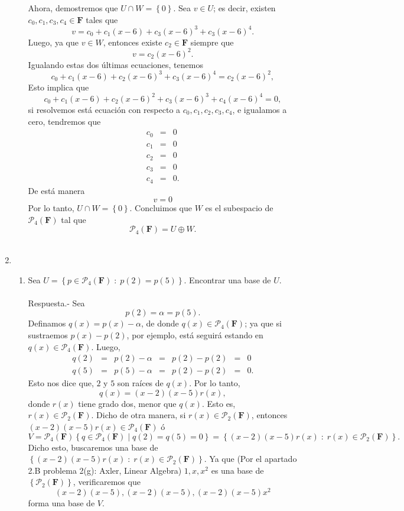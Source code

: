 \begin{enumerate}[\bfseries 1.]
\begin{enumerate}[(a)]
		Ahora, demostremos que $U\cap W=\left\{0\right\}.$ Sea $v\in U$; es decir, existen $c_0,c_1,c_3,c_4\in \textbf{F}$ tales que
		$$v=c_0+c_1(x-6)+c_3(x-6)^3+c_3(x-6)^4.$$
		Luego, ya que $v\in W$, entonces existe $c_2\in \textbf{F}$ siempre que
		$$v=c_2(x-6)^2.$$
		Igualando estas dos últimas ecuaciones, tenemos
		$$c_0+c_1(x-6)+c_2(x-6)^3+c_3(x-6)^4=c_2(x-6)^2,$$
		Esto implica que
		$$c_0+c_1(x-6)+c_2(x-6)^2+c_3(x-6)^3+c_4(x-6)^4=0,$$
		si resolvemos está ecuación con respecto a $c_0,c_1,c_2,c_3,c_4$, e igualamos a cero, tendremos que
		$$
		\begin{array}{rcl}
		    c_0&=&0\\
		    c_1&=&0\\
		    c_2&=&0\\
		    c_3&=&0\\
		    c_4&=&0.
		\end{array}
		$$
		De está manera 
		$$v=0$$
		Por lo tanto, $U\cap W=\left\{0\right\}$. Concluimos que $W$ es el subespacio de $\mathcal{P}_4(\textbf{F})$ tal que 
		$$\mathcal{P}_4(\textbf{F})=U\oplus W.$$\\

	\end{enumerate}

    \item 
	\begin{enumerate}[\bfseries (a)]

	    \item Sea $U=\left\{p\in \mathcal{P}_4(\textbf{F})\; : \; p(2)=p(5)\right\}$. Encontrar una base de $U$.\\\\
		Respuesta.-\; Sea 
		$$p(2)=\alpha=p(5).$$
		Definamos $q(x)=p(x)-\alpha$, de donde $q(x)\in \mathcal{P}_4(\textbf{F})$; ya que si sustraemos $p(x)-p(2)$, por ejemplo, está seguirá estando en $q(x)\in \mathcal{P}_4(\textbf{F})$. Luego,
		$$
		\begin{array}{rcccccl}
		    q(2)&=&p(2)-\alpha&=&p(2)-p(2)&=&0\\
		    q(5)&=&p(5)-\alpha&=&p(2)-p(2)&=&0.
		\end{array}
		$$
		Esto nos dice que, $2$ y $5$ son raíces de $q(x)$. Por lo tanto,
		$$q(x)=\left(x-2\right)\left(x-5\right)r(x),$$
		donde $r(x)$ tiene grado dos, menor que $q(x)$. Esto es, $r(x)\in \mathcal{P}_2(\textbf{F}).$ Dicho de otra manera, si $r(x)\in \mathcal{P}_2(\textbf{F})$, entonces $(x-2)(x-5)r(x)\in \mathcal{P}_4(\textbf{F})$ ó
		$$V=\mathcal{P}_4(\textbf{F})\left\{q\in \mathcal{P}_4(\textbf{F}) \; |\; q(2)=q(5)=0\right\}=\left\{(x-2)(x-5)r(x)\; : \; r(x)\in \mathcal{P}_2(\textbf{F})\right\}.$$
		Dicho esto, buscaremos una base de $\left\{(x-2)(x-5)r(x)\; : \; r(x)\in \mathcal{P}_2(\textbf{F})\right\}$. Ya que (Por el apartado 2.B problema 2(g): Axler, Linear Algebra) $1,x,x^2$ es una base de $\left\{\mathcal{P}_2(\textbf{F})\right\}$, verificaremos que 
		$$(x-2)(x-5),(x-2)(x-5),(x-2)(x-5)x^2$$
		forma una base de $V$.\\


\end{enumerate}
\end{enumerate}
